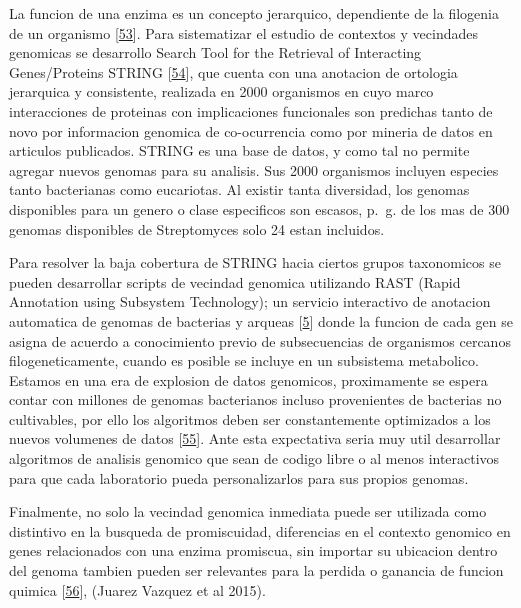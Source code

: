 \documentclass[12pt,twoside]{reedthesis}
\begin{document}
  La funcion de una enzima es un concepto jerarquico, dependiente de la
  filogenia de un organismo
  {[}\protect\hyperlink{ref-szklarczyk_string_2015}{53}{]}. Para
  sistematizar el estudio de contextos y vecindades genomicas se
  desarrollo Search Tool for the Retrieval of Interacting Genes/Proteins
  STRING {[}\protect\hyperlink{ref-snel_string:_2000}{54}{]}, que cuenta
  con una anotacion de ortologia jerarquica y consistente, realizada en
  2000 organismos en cuyo marco interacciones de proteinas con
  implicaciones funcionales son predichas tanto de novo por informacion
  genomica de co-ocurrencia como por mineria de datos en articulos
  publicados. STRING es una base de datos, y como tal no permite agregar
  nuevos genomas para su analisis. Sus 2000 organismos incluyen especies
  tanto bacterianas como eucariotas. Al existir tanta diversidad, los
  genomas disponibles para un genero o clase especificos son escasos,
  p.~g. de los mas de 300 genomas disponibles de Streptomyces solo 24
  estan incluidos.
  
  Para resolver la baja cobertura de STRING hacia ciertos grupos
  taxonomicos se pueden desarrollar scripts de vecindad genomica
  utilizando RAST (Rapid Annotation using Subsystem Technology); un
  servicio interactivo de anotacion automatica de genomas de bacterias y
  arqueas {[}\protect\hyperlink{ref-aziz_rast_2008}{5}{]} donde la funcion
  de cada gen se asigna de acuerdo a conocimiento previo de subsecuencias
  de organismos cercanos filogeneticamente, cuando es posible se incluye
  en un subsistema metabolico. Estamos en una era de explosion de datos
  genomicos, proximamente se espera contar con millones de genomas
  bacterianos incluso provenientes de bacterias no cultivables, por ello
  los algoritmos deben ser constantemente optimizados a los nuevos
  volumenes de datos
  {[}\protect\hyperlink{ref-medema_computational_2015}{55}{]}. Ante esta
  expectativa seria muy util desarrollar algoritmos de analisis genomico
  que sean de codigo libre o al menos interactivos para que cada
  laboratorio pueda personalizarlos para sus propios genomas.
  
  Finalmente, no solo la vecindad genomica inmediata puede ser utilizada
  como distintivo en la busqueda de promiscuidad, diferencias en el
  contexto genomico en genes relacionados con una enzima promiscua, sin
  importar su ubicacion dentro del genoma tambien pueden ser relevantes
  para la perdida o ganancia de funcion quimica
  {[}\protect\hyperlink{ref-noda-garcia_evolution_2013}{56}{]}, (Juarez
  Vazquez et al 2015).
  
\end{document}
